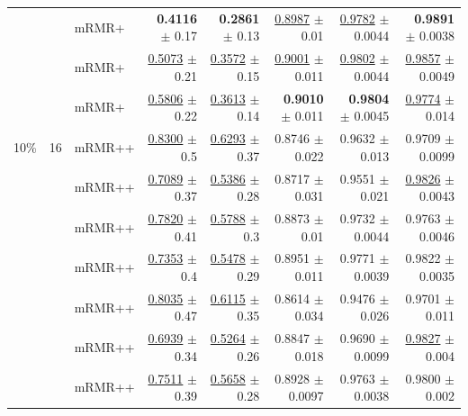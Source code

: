 \begin{longtable}{llp{}rrrrr}
 &  & mRMR+ & \textbf{0.4116} {\scriptsize $\pm$ 0.17} & \textbf{0.2861} {\scriptsize $\pm$ 0.13} & \underline{0.8987} {\scriptsize $\pm$ 0.01} & \underline{0.9782} {\scriptsize $\pm$ 0.0044} & \textbf{0.9891} {\scriptsize $\pm$ 0.0038} \\
 &  & mRMR+ & \underline{0.5073} {\scriptsize $\pm$ 0.21} & \underline{0.3572} {\scriptsize $\pm$ 0.15} & \underline{0.9001} {\scriptsize $\pm$ 0.011} & \underline{0.9802} {\scriptsize $\pm$ 0.0044} & \underline{0.9857} {\scriptsize $\pm$ 0.0049} \\
 &  & mRMR+ & \underline{0.5806} {\scriptsize $\pm$ 0.22} & \underline{0.3613} {\scriptsize $\pm$ 0.14} & \textbf{0.9010} {\scriptsize $\pm$ 0.011} & \textbf{0.9804} {\scriptsize $\pm$ 0.0045} & \underline{0.9774} {\scriptsize $\pm$ 0.014} \\
\midrule
10\% & 16 & mRMR++ & \underline{0.8300} {\scriptsize $\pm$ 0.5} & \underline{0.6293} {\scriptsize $\pm$ 0.37} & 0.8746 {\scriptsize $\pm$ 0.022} & 0.9632 {\scriptsize $\pm$ 0.013} & 0.9709 {\scriptsize $\pm$ 0.0099} \\
 &  & mRMR++ & \underline{0.7089} {\scriptsize $\pm$ 0.37} & \underline{0.5386} {\scriptsize $\pm$ 0.28} & 0.8717 {\scriptsize $\pm$ 0.031} & 0.9551 {\scriptsize $\pm$ 0.021} & \underline{0.9826} {\scriptsize $\pm$ 0.0043} \\
 &  & mRMR++ & \underline{0.7820} {\scriptsize $\pm$ 0.41} & \underline{0.5788} {\scriptsize $\pm$ 0.3} & 0.8873 {\scriptsize $\pm$ 0.01} & 0.9732 {\scriptsize $\pm$ 0.0044} & 0.9763 {\scriptsize $\pm$ 0.0046} \\
 &  & mRMR++ & \underline{0.7353} {\scriptsize $\pm$ 0.4} & \underline{0.5478} {\scriptsize $\pm$ 0.29} & 0.8951 {\scriptsize $\pm$ 0.011} & 0.9771 {\scriptsize $\pm$ 0.0039} & 0.9822 {\scriptsize $\pm$ 0.0035} \\
 &  & mRMR++ & \underline{0.8035} {\scriptsize $\pm$ 0.47} & \underline{0.6115} {\scriptsize $\pm$ 0.35} & 0.8614 {\scriptsize $\pm$ 0.034} & 0.9476 {\scriptsize $\pm$ 0.026} & 0.9701 {\scriptsize $\pm$ 0.011} \\
 &  & mRMR++ & \underline{0.6939} {\scriptsize $\pm$ 0.34} & \underline{0.5264} {\scriptsize $\pm$ 0.26} & 0.8847 {\scriptsize $\pm$ 0.018} & 0.9690 {\scriptsize $\pm$ 0.0099} & \underline{0.9827} {\scriptsize $\pm$ 0.004} \\
 &  & mRMR++ & \underline{0.7511} {\scriptsize $\pm$ 0.39} & \underline{0.5658} {\scriptsize $\pm$ 0.28} & 0.8928 {\scriptsize $\pm$ 0.0097} & 0.9763 {\scriptsize $\pm$ 0.0038} & 0.9800 {\scriptsize $\pm$ 0.002} \\

\end{longtable}
